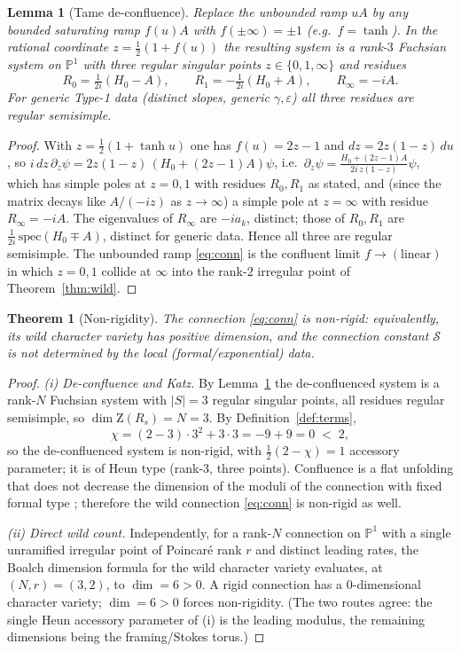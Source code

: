 \documentclass[11pt]{article}
\newtheorem{theorem}{Theorem}
\newtheorem{lemma}{Lemma}
\theoremstyle{definition}
\newcommand{\eps}{\varepsilon}
\newcommand{\PP}{\mathbb{P}^1}
\newcommand{\Stab}{\mathrm{Z}}
\newcommand{\Scat}{\mathcal{S}}
\begin{document}
\begin{lemma}[Tame de-confluence]\label{lem:deconf}
Replace the unbounded ramp $uA$ by any bounded saturating ramp $f(u)A$ with $f(\pm\infty)=\pm1$
(e.g.\ $f=\tanh$). In the rational coordinate $z=\tfrac12(1+f(u))$ the resulting system is a rank-$3$
\emph{Fuchsian} system on $\PP$ with three regular singular points $z\in\{0,1,\infty\}$ and residues
\[
R_0=\tfrac{1}{2i}(H_0-A),\qquad R_1=-\tfrac{1}{2i}(H_0+A),\qquad R_\infty=-iA .
\]
For generic Type-1 data (distinct slopes, generic $\gamma,\eps$) all three residues are regular semisimple.
\end{lemma}

\begin{proof}
With $z=\tfrac12(1+\tanh u)$ one has $f(u)=2z-1$ and $dz=2z(1-z)\,du$, so
$i\,dz\,\partial_z\psi = 2z(1-z)\,(H_0+(2z-1)A)\psi$, i.e.\ $\partial_z\psi=\frac{H_0+(2z-1)A}{2i\,z(1-z)}\psi$,
which has simple poles at $z=0,1$ with residues $R_0,R_1$ as stated, and (since the matrix decays like $A/(-iz)$
as $z\to\infty$) a simple pole at $z=\infty$ with residue $R_\infty=-iA$. The eigenvalues of $R_\infty$ are
$-ia_k$, distinct; those of $R_{0},R_{1}$ are $\tfrac{1}{2i}\,\mathrm{spec}(H_0\mp A)$, distinct for generic
data. Hence all three are regular semisimple. The unbounded ramp \eqref{eq:conn} is the confluent limit
$f\to(\text{linear})$ in which $z=0,1$ collide at $\infty$ into the rank-$2$ irregular point of
Theorem~\ref{thm:wild}.
\end{proof}

\begin{theorem}[Non-rigidity]\label{thm:nonrigid}
The connection \eqref{eq:conn} is non-rigid: equivalently, its wild character variety has positive dimension,
and the connection constant $\Scat$ is \emph{not} determined by the local (formal/exponential) data.
\end{theorem}

\begin{proof}
\emph{(i) De-confluence and Katz.} By Lemma~\ref{lem:deconf} the de-confluenced system is a rank-$N$ Fuchsian
system with $|S|=3$ regular singular points, all residues regular semisimple, so $\dim \Stab(R_s)=N=3$. By
Definition~\ref{def:terms},
\[
\chi=(2-3)\cdot 3^2+3\cdot 3=-9+9=0\;<\;2,
\]
so the de-confluenced system is non-rigid, with $\tfrac12(2-\chi)=1$ accessory parameter; it is of Heun type
(rank-$3$, three points). Confluence is a flat unfolding that does not decrease the dimension of the moduli of
the connection with fixed formal type \cite{JMU,Boalch}; therefore the wild connection \eqref{eq:conn} is
non-rigid as well.

\emph{(ii) Direct wild count.} Independently, for a rank-$N$ connection on $\PP$ with a single unramified
irregular point of Poincar\'e rank $r$ and distinct leading rates, the Boalch dimension formula for the wild
character variety \cite{Boalch} evaluates, at $(N,r)=(3,2)$, to $\dim=6>0$. A rigid connection has a
$0$-dimensional character variety; $\dim=6>0$ forces non-rigidity. (The two routes agree: the single Heun
accessory parameter of (i) is the leading modulus, the remaining dimensions being the framing/Stokes torus.)
\end{proof}
\end{document}
